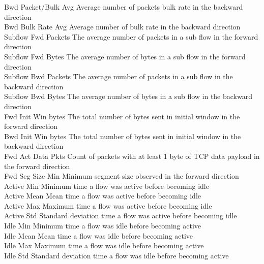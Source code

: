 Bwd Packet/Bulk Avg 		Average number of packets bulk rate in the backward direction \\
Bwd Bulk Rate Avg		Average number of bulk rate in the backward direction \\
Subflow Fwd Packets		The average number of packets in a sub flow in the forward direction \\
Subflow Fwd Bytes		The average number of bytes in a sub flow in the forward direction \\
Subflow Bwd Packets		The average number of packets in a sub flow in the backward direction \\
Subflow Bwd Bytes		The average number of bytes in a sub flow in the backward direction \\
Fwd Init Win bytes		The total number of bytes sent in initial window in the forward direction \\
Bwd Init Win bytes		The total number of bytes sent in initial window in the backward direction \\
Fwd Act Data Pkts		Count of packets with at least 1 byte of TCP data payload in the forward direction \\
Fwd Seg Size Min		Minimum segment size observed in the forward direction \\
Active Min			Minimum time a flow was active before becoming idle \\
Active Mean			Mean time a flow was active before becoming idle \\
Active Max			Maximum time a flow was active before becoming idle \\
Active Std			Standard deviation time a flow was active before becoming idle \\
Idle Min			Minimum time a flow was idle before becoming active \\
Idle Mean			Mean time a flow was idle before becoming active \\
Idle Max			Maximum time a flow was idle before becoming active \\
Idle Std			Standard deviation time a flow was idle before becoming active \\


